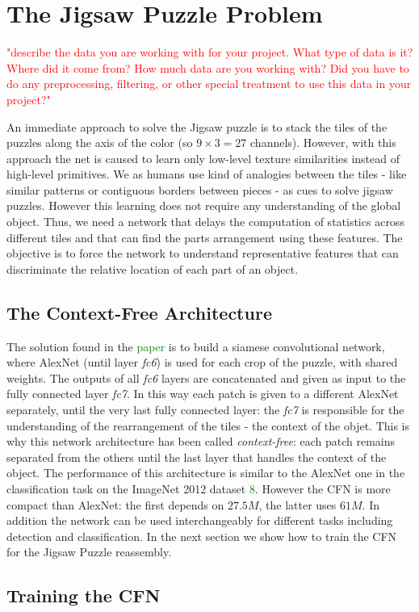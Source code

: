 \section{The Jigsaw Puzzle Problem}
\textcolor{red}{"describe the data you are working with for your project. What type of data is it? Where did it come from? How much data are you working with? Did you have to do any preprocessing, filtering, or other special treatment to use this data in your project?"}

An immediate approach to solve the Jigsaw puzzle is to stack the tiles of the puzzles along the axis of the color (so \(9\times3=27\) channels). However, with this approach the net is caused to learn only low-level texture similarities instead of high-level primitives. We as humans use kind of analogies between the tiles - like similar patterns or contiguous borders between pieces - as cues to solve jigsaw puzzles. However this learning does not require any understanding of the global object. Thus, we need a network that delays the computation of statistics across different tiles and that can find the parts arrangement using these features. The objective is to force the network to understand representative features that can discriminate the relative location of each part of an object.

\subsection{The Context-Free Architecture}
The solution found in the \textcolor{green}{paper} is to build a siamese convolutional network, where AlexNet (until layer \textit{fc6}) is used for each crop of the puzzle, with shared weights. The outputs of all \textit{fc6} layers are concatenated and given as input to the fully connected layer \textit{fc7}. In this way each patch is given to a different AlexNet separately, until the very last fully connected layer: the \textit{fc7} is responsible for the understanding of the rearrangement of the tiles - the context of the objet. This is why this network architecture has been called \textit{context-free}: each patch remains separated from the others until the last layer that handles the context of the object. \newline
The performance of this architecture is similar to the AlexNet one in the classification task on the ImageNet 2012 dataset \textcolor{green}{8}. However the CFN is more compact than AlexNet: the first depends on \(27.5M\), the latter uses \(61M\). In addition the network can be used interchangeably for different tasks including detection and classification. \newline
In the next section we show how to train the CFN for the Jigsaw Puzzle reassembly.

\subsection{Training the CFN}
\subsubsection{}
